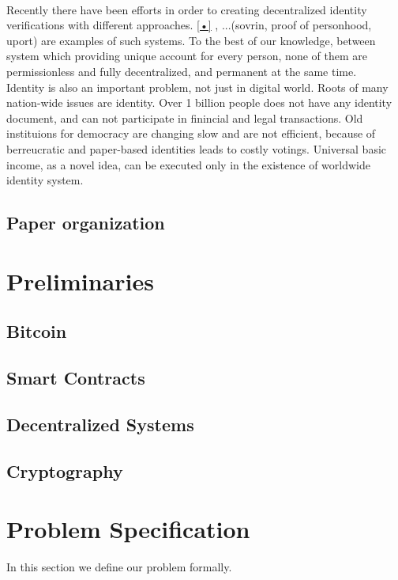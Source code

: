 \documentclass{article}
\begin{document}
\\
Recently there have been efforts in order to creating decentralized identity verifications with different approaches.  \ref{•} , ...(sovrin, proof of personhood, uport) are examples of such systems. To the best of our knowledge, between system which providing unique account for every person, none of them are permissionless and fully decentralized, and permanent at the same time.
\\
Identity is also an important problem, not just in digital world. Roots of many nation-wide issues are identity. Over 1 billion people  does not have any identity document, and can not participate in finincial and legal transactions. Old instituions for democracy are changing slow and are not efficient, because of berreucratic and paper-based identities leads to costly votings. Universal basic income, as a novel idea, can be executed only in the existence of worldwide identity system.

\subsection{Paper organization}



\section{Preliminaries}
\subsection{Bitcoin}
\subsection{Smart Contracts}
\subsection{Decentralized Systems}
\subsection{Cryptography}


\section{ Problem Specification}
In this section we define our problem formally.
\end{document}
